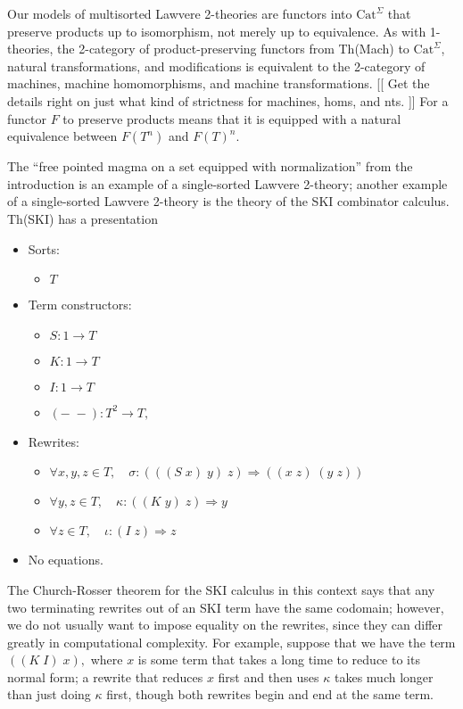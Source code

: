 \documentclass{article}
\newcommand{\maps}{\colon}
\newcommand{\Cat}{\mathrm{Cat}}
\begin{document}
Our models of multisorted Lawvere 2-theories are functors into $\Cat^\Sigma$ that preserve products up to isomorphism, not merely up to equivalence.  As with 1-theories, the 2-category of product-preserving functors from Th(Mach) to $\Cat^\Sigma$, natural transformations, and modifications is equivalent to the 2-category of machines, machine homomorphisms, and machine transformations.  [[ Get the details right on just what kind of strictness for machines, homs, and nts. ]] For a functor $F$ to preserve products means that it is equipped with a natural equivalence between $F(T^n)$ and $F(T)^n.$

The ``free pointed magma on a set equipped with normalization'' from the introduction is an example of a single-sorted Lawvere 2-theory; another example of a single-sorted Lawvere 2-theory is the theory of the SKI combinator calculus.  Th(SKI) has a presentation
\begin{center}
  \begin{itemize}
    \item Sorts:
    \begin{itemize}
      \item $T$
    \end{itemize}
    \item Term constructors:
    \begin{itemize}
      \item $S\maps 1 \to T$
      \item $K\maps 1 \to T$
      \item $I\maps 1 \to T$
      \item $(-\;-)\maps T^2 \to T,$
    \end{itemize}
    \item Rewrites:
    \begin{itemize}
      \item $\forall x,y,z \in T, \quad \sigma \maps (((S\; x)\; y)\; z) \Rightarrow ((x\; z)\; (y\; z))$
      \item $\forall y,z \in T, \quad \kappa \maps ((K\; y)\; z) \Rightarrow y$
      \item $\forall z \in T, \quad \iota \maps (I\; z) \Rightarrow z$
    \end{itemize}
    \item No equations.
  \end{itemize}
\end{center}
The Church-Rosser theorem for the SKI calculus in this context says that any two terminating rewrites out of an SKI term have the same codomain; however, we do not usually want to impose equality on the rewrites, since they can differ greatly in computational complexity.  For example, suppose that we have the term $((K\; I)\; x),$ where $x$ is some term that takes a long time to reduce to its normal form; a rewrite that reduces $x$ first and then uses $\kappa$ takes much longer than just doing $\kappa$ first, though both rewrites begin and end at the same term.
\end{document}
